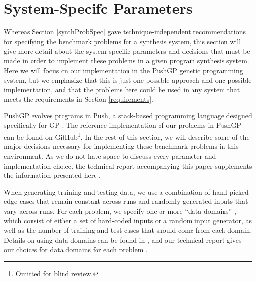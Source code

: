 \documentclass{sig-alternate}
\begin{document}
\section{System-Specifc Parameters} \label{systemParamsSection}

Whereas Section \ref{synthProbSpec} gave technique-independent recommendations for specifying the benchmark problems for a synthesis system, this section will give more detail about the system-specific parameters and decisions that must be made in order to implement these problems in a given program synthesis system. Here we will focus on our implementation in the PushGP genetic programming system, but we emphasize that this is just one possible approach and one possible implementation, and that the problems here could be used in any system that meets the requirements in Section \ref{requirements}.

PushGP evolves programs in Push, a stack-based programming language designed specifically for GP \cite{spector:2002:GPEM, 1068292}. %
The reference implementation of our problems in PushGP can be found on GitHub\footnote{Omitted for blind review.}. In the rest of this section, we will describe some of the major decisions necessary for implementing these benchmark problems in this environment. As we do not have space to discuss every parameter and implementation choice, the technical report accompanying this paper supplements the information presented here \cite{helmuth:umass:tr}.

When generating training and testing data, we use a combination of hand-picked edge cases that remain constant across runs and randomly generated inputs that vary across runs. For each problem, we specify one or more ``data domains'' \cite{Helmuth:2014:GECCO}, which consist of either a set of hard-coded inputs or a random input generator, as well as the number of training and test cases that should come from each domain. Details on using data domains can be found in \cite{Helmuth:2014:GECCO}, and our technical report gives our choices for data domains for each problem \cite{helmuth:umass:tr}.
\end{document}
